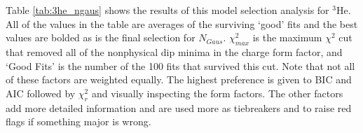 Table \ref{tab:3he_ngaus} shows the results of this model selection analysis for $^3$He. All of the values in the table are averages of the surviving `good' fits and the best values are bolded as is the final selection for $N_{Gaus}$. $\chi^2_{max}$ is the maximum $\chi^2$ cut that removed all of the nonphysical dip minima in the charge form factor, and `Good Fits' is the number of the 100 fits that survived this cut. Note that not all of these factors are weighted equally. The highest preference is given to BIC and AIC followed by $\chi^2_r$ and visually inspecting the form factors. The other factors add more detailed information and are used more as tiebreakers and to raise red flags if something major is wrong.


